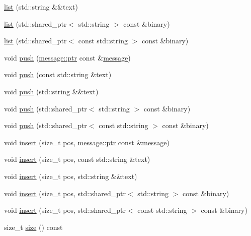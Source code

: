 \begin{DoxyCompactItemize}
\hyperlink{classsio_1_1message_1_1list_a5dc43909949e882f8e5a8834a3e7bf62}{list} (std\+::string \&\&text)
\item 
\hyperlink{classsio_1_1message_1_1list_a5b5ae7e73e7436114f980fca8c117fa6}{list} (std\+::shared\+\_\+ptr$<$ std\+::string $>$ const \&binary)
\item 
\hyperlink{classsio_1_1message_1_1list_a6bcc32fb3cea6748a73cbeff066debc3}{list} (std\+::shared\+\_\+ptr$<$ const std\+::string $>$ const \&binary)
\item 
void \hyperlink{classsio_1_1message_1_1list_a558c9b495a570073a80fbcb4b92a415d}{push} (\hyperlink{classsio_1_1message_a6340b6fef57e4516eb17928b1885a615}{message\+::ptr} const \&\hyperlink{classsio_1_1message}{message})
\item 
void \hyperlink{classsio_1_1message_1_1list_a6e141a152fef49d24fee402d23c78926}{push} (const std\+::string \&text)
\item 
void \hyperlink{classsio_1_1message_1_1list_ac7d730e959475a948d1e338360b3d7c8}{push} (std\+::string \&\&text)
\item 
void \hyperlink{classsio_1_1message_1_1list_ad99e6620bd7fcc51d8ae412cfe223e2a}{push} (std\+::shared\+\_\+ptr$<$ std\+::string $>$ const \&binary)
\item 
void \hyperlink{classsio_1_1message_1_1list_abf0d78408f9563cdcef22820419dcf16}{push} (std\+::shared\+\_\+ptr$<$ const std\+::string $>$ const \&binary)
\item 
void \hyperlink{classsio_1_1message_1_1list_afa415670851855923f74ccb8837267d9}{insert} (size\+\_\+t pos, \hyperlink{classsio_1_1message_a6340b6fef57e4516eb17928b1885a615}{message\+::ptr} const \&\hyperlink{classsio_1_1message}{message})
\item 
void \hyperlink{classsio_1_1message_1_1list_a4fd814b68e176d8098801db1de7a1cf1}{insert} (size\+\_\+t pos, const std\+::string \&text)
\item 
void \hyperlink{classsio_1_1message_1_1list_a7d0ab6d30e2381d0d0b8ae69ce68926a}{insert} (size\+\_\+t pos, std\+::string \&\&text)
\item 
void \hyperlink{classsio_1_1message_1_1list_af5eefe06e865dcf24ef0912b61a868c3}{insert} (size\+\_\+t pos, std\+::shared\+\_\+ptr$<$ std\+::string $>$ const \&binary)
\item 
void \hyperlink{classsio_1_1message_1_1list_a8d3941008fd93e9fc068f07192912f4d}{insert} (size\+\_\+t pos, std\+::shared\+\_\+ptr$<$ const std\+::string $>$ const \&binary)
\item 
size\+\_\+t \hyperlink{classsio_1_1message_1_1list_ab6107e3ef270aa6824c34129e1767843}{size} () const

\end{DoxyCompactItemize}
